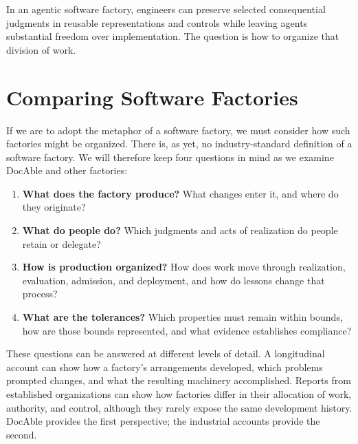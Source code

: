 
In an agentic software factory, engineers can preserve selected consequential judgments in reusable representations and controls while leaving agents substantial freedom over implementation. The question is how to organize that division of work.

\section{Comparing Software Factories}\label{heading:walking-through-a-software-factory}


If we are to adopt the metaphor of a software factory, we must consider how such factories might be organized. There is, as yet, no industry-standard definition of a software factory. We will therefore keep four questions in mind as we examine DocAble and other factories:

\begin{enumerate}
\def\labelenumi{\arabic{enumi}.}
\tightlist
\item
  \textbf{What does the factory produce?} What changes enter it, and where do they originate?
\item
  \textbf{What do people do?} Which judgments and acts of realization do people retain or delegate?
\item
  \textbf{How is production organized?} How does work move through realization, evaluation, admission, and deployment, and how do lessons change that process?
\item
  \textbf{What are the tolerances?} Which properties must remain within bounds, how are those bounds represented, and what evidence establishes compliance?
\end{enumerate}


These questions can be answered at different levels of detail. A longitudinal account can show how a factory's arrangements developed, which problems prompted changes, and what the resulting machinery accomplished. Reports from established organizations can show how factories differ in their allocation of work, authority, and control, although they rarely expose the same development history. DocAble provides the first perspective; the industrial accounts provide the second.
